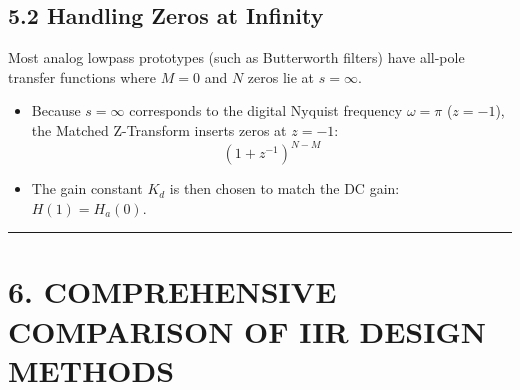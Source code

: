 \documentclass[11pt,a4paper]{article}
\begin{document}
\subsection{5.2 Handling Zeros at Infinity}
Most analog lowpass prototypes (such as Butterworth filters) have all-pole transfer functions where $M = 0$ and $N$ zeros lie at $s = \infty$.
\begin{itemize}
    \item Because $s = \infty$ corresponds to the digital Nyquist frequency $\omega = \pi$ ($z = -1$), the Matched Z-Transform inserts zeros at $z = -1$:
    \begin{equation}
    (1 + z^{-1})^{N - M}
    \end{equation}
    \item The gain constant $K_d$ is then chosen to match the DC gain: $H(1) = H_a(0)$.
\end{itemize}

\noindent\rule{\textwidth}{0.5pt}

\section{6. COMPREHENSIVE COMPARISON OF IIR DESIGN METHODS}
\end{document}
